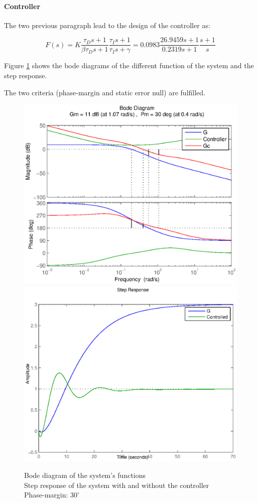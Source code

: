 \paragraph{Controller}

The two previous paragraph lead to the design of the controller as:

$$ F(s) = K \frac{\tau_D s + 1}{\beta \tau_D s + 1} \frac{\tau_I s + 1}{\tau_I s + \gamma} = 0.0983 \frac{26.9459 s + 1}{0.2319 s + 1}\frac{s+1}{s}$$

Figure \ref{figstep411} shows the bode diagrams of the different function of the system and the step response. 

The two criteria (phase-margin and static error null) are fulfilled.

\begin{figure}[h!t]
    \includegraphics[width=\columnwidth]{fig/bode411.eps}
    \includegraphics[width=\columnwidth]{fig/step411.eps}
    \caption{Bode diagram of the system's functions \\ Step response of the system with and without the controller\\ Phase-margin: $30^{\circ}$}
    \label{figstep411}
\end{figure}



